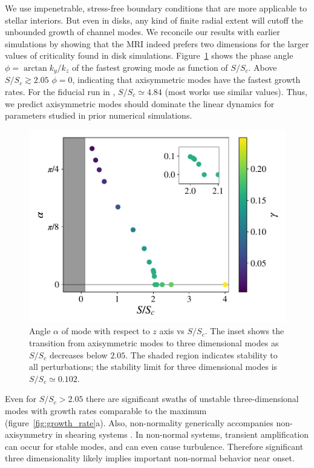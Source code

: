 \documentclass[aps,prl,reprint,superscriptaddress]{revtex4-1}
\newcommand{\SSC}{S/S_{c}}
\begin{document}
We use impenetrable, stress-free boundary conditions that are more applicable to stellar interiors. 
But even in disks, any kind of finite radial extent will cutoff the unbounded growth of channel modes. 
We reconcile our results with earlier simulations by showing that the MRI indeed prefers two dimensions for the larger values of  criticality found in disk simulations. 
Figure~\ref{fig:alpha} shows the phase angle $\phi = \arctan k_y/k_z$ of the fastest growing mode as function of $\SSC$.
Above $\SSC \gtrsim 2.05$ $\phi=0$, indicating that axisymmetric modes have the fastest growth rates.
For the fiducial run in \citet{1996ApJ...464..690H}, $\SSC \simeq 4.84$ (most works use similar values).
Thus, we predict axisymmetric modes should dominate the linear dynamics for parameters studied in prior numerical simulations.
%
\begin{figure}[h!]
  \includegraphics[width=\columnwidth]{alpha_vs_ssc_grid.pdf}
  \caption{Angle $\alpha$ of mode with respect to $z$ axis vs $\SSC$. The inset shows the transition from axisymmetric modes to three dimensional modes as $\SSC$ decreases below $2.05$. The shaded region indicates stability to all perturbations; the stability limit for three dimensional modes is $\SSC \simeq 0.102$.}
  \label{fig:alpha}
\end{figure}
%

Even for $\SSC> 2.05$ there are significant swaths of unstable three-dimensional modes with growth rates comparable to the maximum (figure~\ref{fig:growth_rate}a).
Also, non-normality generically accompanies non-axisymmetry in shearing systems \citep[see][for a discussion relevant to the MRI]{1992MNRAS.255P..25K}.
In non-normal systems, transient amplification can occur for stable modes, and can even cause turbulence.
Therefore significant three dimensionality likely implies important non-normal behavior near onset.
\end{document}
